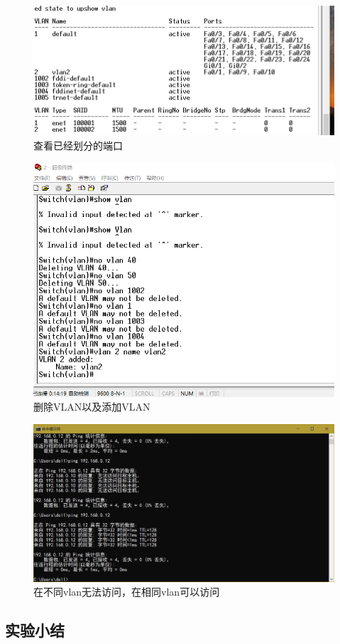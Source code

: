 \documentclass[lang=cn,11pt,a4paper,cite=authoryear]{elegantpaper}
\begin{document}
\begin{figure}[htbp]
	\centering
	\includegraphics[width=0.7\linewidth]{image/vlan2}
	\caption{查看已经划分的端口}
	\label{fig:vlan2}
\end{figure}

\begin{figure}[htbp]
	\centering
	\includegraphics[width=0.7\linewidth]{image/vlan3}
	\caption{删除VLAN以及添加VLAN}
	\label{fig:vlan3}
\end{figure}


\begin{figure}[htbp]
	\centering
	\includegraphics[width=0.7\linewidth]{image/在不同vlan无法访问，在相同vlan可以访问}
	\caption{在不同vlan无法访问，在相同vlan可以访问}
	\label{fig:vlanvlan}
\end{figure}



\subsection{实验小结}
\end{document}
